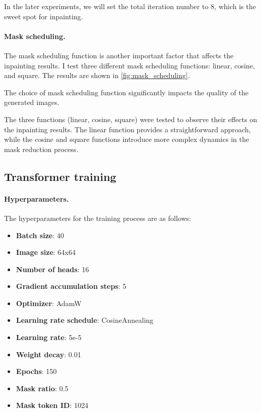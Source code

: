 \documentclass[twocolumn,a4paper]{article}
\begin{document}
In the later experiments, we will set the total iteration number to 8, which is the sweet spot for inpainting.

\paragraph{Mask scheduling.} The mask scheduling function is another important factor that affects the inpainting results. I test three different mask scheduling functions: linear, cosine, and square. The results are shown in \autoref{fig:mask_scheduling}.

The choice of mask scheduling function significantly impacts the quality of the generated images.

The three functions (linear, cosine, square) were tested to observe their effects on the inpainting results. The linear function provides a straightforward approach, while the cosine and square functions introduce more complex dynamics in the mask reduction process.


\subsection{Transformer training}
\paragraph{Hyperparameters.} The hyperparameters for the training process are as follows:
\begin{itemize}
    \item \textbf{Batch size}: 40
    \item \textbf{Image size}: 64x64
    \item \textbf{Number of heads}: 16
    \item \textbf{Gradient accumulation steps}: 5
    \item \textbf{Optimizer}: AdamW
    \item \textbf{Learning rate schedule}: CosineAnnealing
    \item \textbf{Learning rate}: 5e-5
    \item \textbf{Weight decay}: 0.01
    \item \textbf{Epochs}: 150
    \item \textbf{Mask ratio}: 0.5
    \item \textbf{Mask token ID}: 1024
\end{itemize}



\printbibliography
\end{document}
